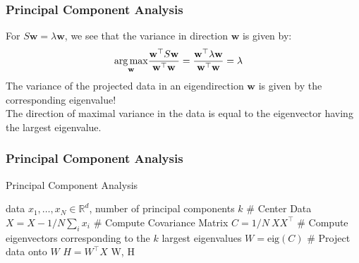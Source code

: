 \documentclass[Nike]{tuberlinbeamer}
\newcommand{\R}{\ensuremath{\mathds{R}}}
\newcommand{\bw}{\mathbf{w}}
\begin{document}
\begin{frame}\frametitle{Principal Component Analysis}
For $S \bw = \lambda \bw $, we see that the variance in direction $\bw$ is given by:
\begin{align}\nonumber
\argmax_{\bw} &\frac{\bw^{\top} S \bw}{\bw^\top\bw} =  \frac{\bw^{\top} \lambda \bw}{\bw^\top\bw} = \lambda
\end{align}
The variance of the projected data in an eigendirection $\bw$ is given by the corresponding eigenvalue! \\ \pause
\vspace{2em}
The direction of maximal variance in the data is equal to the eigenvector having the largest eigenvalue.
\end{frame}

\begin{frame}[fragile]\frametitle{Principal Component Analysis}
\scriptsize
\begin{algorithm}[H]
  \caption{Principal Component Analysis}
  \begin{algorithmic}[1]
    \REQUIRE data $x_1, \ldots, x_N \in \R^d$, number of principal components $k$
    \STATE \# Center Data
     \STATE $X = X - 1/N\sum_ix_i$
     \STATE \# Compute Covariance Matrix
     \STATE $C = 1/N ~XX^{\top}$
     \STATE \# Compute eigenvectors corresponding to the $k$ largest eigenvalues
     \STATE $W = \text{eig}(C)$
     \STATE \# Project data onto $W$
     \STATE $H = W^\top X$
\RETURN W, H
  \end{algorithmic}
\end{algorithm}
\end{frame}
\end{document}
